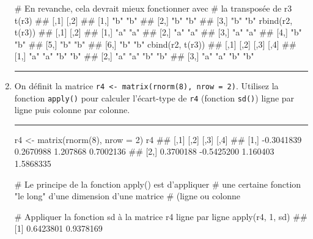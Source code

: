 \documentclass[12pt,twosided, notitlepage]{book}
\newenvironment{Shaded}{}{}
\newcommand{\KeywordTok}[1]{\textcolor[rgb]{0.00,0.00,1.00}{{#1}}}
\newcommand{\DataTypeTok}[1]{{#1}}
\newcommand{\DecValTok}[1]{{#1}}
\newcommand{\StringTok}[1]{\textcolor[rgb]{0.00,0.50,0.50}{{#1}}}
\newcommand{\CommentTok}[1]{\textcolor[rgb]{0.00,0.50,0.00}{{#1}}}
\newcommand{\NormalTok}[1]{{#1}}
\newif \ifsol
\renewenvironment{Shaded}{\begin{snugshade}}{\end{snugshade}}
\begin{document}
\begin{enumerate}
\begin{Shaded}
\begin{Highlighting}[]
\CommentTok{# En revanche, cela devrait mieux fonctionner avec }
\CommentTok{# la transposée de r3}
\KeywordTok{t}\NormalTok{(r3)}
  \NormalTok{##      [,1] [,2]}
  \NormalTok{## [1,] "b"  "b" }
  \NormalTok{## [2,] "b"  "b" }
  \NormalTok{## [3,] "b"  "b"}
\KeywordTok{rbind}\NormalTok{(r2, }\KeywordTok{t}\NormalTok{(r3))}
  \NormalTok{##      [,1] [,2]}
  \NormalTok{## [1,] "a"  "a" }
  \NormalTok{## [2,] "a"  "a" }
  \NormalTok{## [3,] "a"  "a" }
  \NormalTok{## [4,] "b"  "b" }
  \NormalTok{## [5,] "b"  "b" }
  \NormalTok{## [6,] "b"  "b"}
\KeywordTok{cbind}\NormalTok{(r2, }\KeywordTok{t}\NormalTok{(r3))}
  \NormalTok{##      [,1] [,2] [,3] [,4]}
  \NormalTok{## [1,] "a"  "a"  "b"  "b" }
  \NormalTok{## [2,] "a"  "a"  "b"  "b" }
  \NormalTok{## [3,] "a"  "a"  "b"  "b"}
\end{Highlighting}
\end{Shaded}

  \begin{center} \rule{0.5\linewidth}{\linethickness}\end{center}

  \bigskip  \fi 
\item
  On définit la matrice
  \texttt{r4\ \textless{}-\ matrix(rnorm(8),\ nrow\ =\ 2)}. Utilisez la
  fonction \texttt{apply()} pour calculer
  l'écart-type de \texttt{r4} (fonction
  \texttt{sd()}) ligne par ligne puis colonne
  par colonne.

  \ifsol 

  \begin{center} \rule{0.5\linewidth}{\linethickness}\end{center}

\begin{Shaded}
\begin{Highlighting}[]
\NormalTok{r4 <-}\StringTok{ }\KeywordTok{matrix}\NormalTok{(}\KeywordTok{rnorm}\NormalTok{(}\DecValTok{8}\NormalTok{), }\DataTypeTok{nrow =} \DecValTok{2}\NormalTok{)}
\NormalTok{r4}
  \NormalTok{##            [,1]       [,2]     [,3]      [,4]}
  \NormalTok{## [1,] -0.3041839  0.2670988 1.207868 0.7002136}
  \NormalTok{## [2,]  0.3700188 -0.5425200 1.160403 1.5868335}

\CommentTok{# Le principe de la fonction apply() est d'appliquer}
\CommentTok{# une certaine fonction "le long" d'une dimension d'une matrice}
\CommentTok{# (ligne ou colonne}

\CommentTok{# Appliquer la fonction sd à la matrice r4 ligne par ligne}
\KeywordTok{apply}\NormalTok{(r4, }\DecValTok{1}\NormalTok{, sd)}
  \NormalTok{## [1] 0.6423801 0.9378169}


\end{Highlighting}
\end{Shaded}
\end{enumerate}
\end{document}

